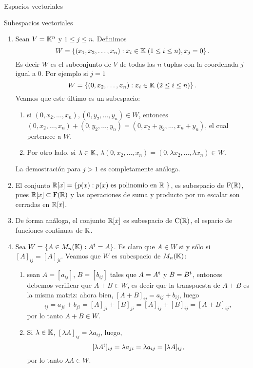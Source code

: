 \begin{chapter}{Espacios vectoriales}
\begin{section}{Subespacios vectoriales}
\begin{ejemplo*}
\begin{enumerate}
        
        \item Sean $V=\mathbb K^n$ y $1\le j \le n$. Definimos 
        $$
        W = \left\{ (x_1,x_2,\ldots,x_n): x_i \in \mathbb K\; (1 \le i \le n), x_j =0\right\}.
        $$
        Es decir $W$  es el subconjunto de $V$ de todas las $n$-tuplas con la coordenada $j$ igual a 0. Por ejemplo  si $j=1$ 
        $$
        W = \left\{ (0,x_2,\ldots,x_n): x_i \in \mathbb K \;(2 \le i \le n)\right\}.
        $$
        Veamos que este último es un subespacio: 
        \begin{enumerate}
            \item si $(0,x_2,\ldots,x_n), (0,y_2,\ldots,y_n) \in W$,  entonces
            $(0,x_2,\ldots,x_n)+ (0,y_2,\ldots,y_n) = (0,x_2+y_2,\ldots,x_n+y_n)$, el cual pertenece a $W$. 
            \item 	Por otro lado, si $\lambda \in \mathbb K$, $\lambda(0,x_2,\ldots,x_n) = (0,\lambda x_2,\ldots,\lambda x_n) \in W$.
        \end{enumerate}
        La demostración para $j >1$ es completamente análoga. 
        \item El  conjunto $\mathbb R[x] = \left\{p(x): p(x) \text{ es polinomio en $\mathbb R$ } \right\}$, es subespacio de $\operatorname{F}(\mathbb R)$, pues $\mathbb R[x] \subset \operatorname{F}(\mathbb R)$ y las operaciones de suma y producto por un escalar son cerradas en $\mathbb R[x]$.
        \item De forma análoga, el conjunto $\mathbb R[x]$ es subespacio de $\operatorname{C}(\mathbb R)$,  el espacio de funciones continuas de  $\mathbb R$.
        \item Sea $W= \left\{A \in M_n(\mathbb K): A^{\operatorname{t}} = A \right\}$. Es claro que  $A \in W$ si y sólo si $[A]_{ij} = [A]_{ji}$. Veamos que  $W$ es subespacio de $M_n(\mathbb K)$: 
        \begin{enumerate}
            \item sean $A=[a_{ij}]$, $B= [b_{ij}]$ tales que $A=A^{\operatorname{t}}$ y $B=B^{\operatorname{t}}$, entonces debemos verificar que $A+ B \in W$,  es decir que la transpuesta de $A+B$  es la misma matriz: ahora bien, $[A+B]_{ij} = a_{ij}+b_{ij}$, luego 
            \begin{equation*}
                [(A+B)^\t]_{ij} =a_{ji}+b_{ji} = [A]_{ji} + [B]_{ji} = [A]_{ij} + [B]_{ij} = [A+B]_{ij},
            \end{equation*}
            por lo tanto $A+B \in W$.
            \item Si $\lambda \in \mathbb K$, $[\lambda A]_{ij} = \lambda a_{ij}$, luego, 
            $$
            [\lambda A^{\operatorname{t}}]_{ij} = \lambda a_{ji} = \lambda a_{ij} = [\lambda A]_{ij},
            $$
            por lo tanto $\lambda A \in W$.
        \end{enumerate} 	


\end{enumerate}
\end{ejemplo*}
\end{section}
\end{chapter}

